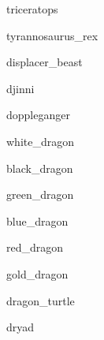 \documentclass[letterpaper,serif]{module}
\begin{document}
\begin{newmonster}{triceratops}\end{newmonster}

\begin{newmonster}{tyrannosaurus_rex}\end{newmonster}

\begin{newmonster}{displacer_beast}\end{newmonster}

\begin{newmonster}{djinni}\end{newmonster}

\begin{newmonster}{doppleganger}\end{newmonster}


\begin{newmonster}{white_dragon}\end{newmonster}

\begin{newmonster}{black_dragon}\end{newmonster}

\begin{newmonster}{green_dragon}\end{newmonster}

\begin{newmonster}{blue_dragon}\end{newmonster}

\begin{newmonster}{red_dragon}\end{newmonster}

\begin{newmonster}{gold_dragon}\end{newmonster}

\begin{newmonster}{dragon_turtle}\end{newmonster}

\begin{newmonster}{dryad}\end{newmonster}
\end{document}
